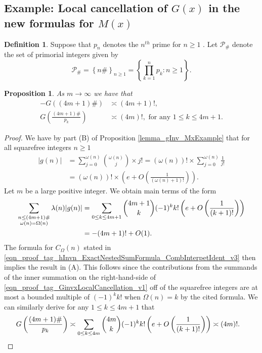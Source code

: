 \documentclass[11pt,reqno,a4letter]{article}
\newcommand{\hlocalref}[1]{\hyperref[#1]{\ref{#1}}}
\numberwithin{equation}{section}
\numberwithin{figure}{section}
\numberwithin{table}{section}
\newcommand{\seqnum}[1]{\href{http://oeis.org/#1}{\color{ProcessBlue}{\underline{#1}}}}
\theoremstyle{plain}
\newtheorem{prop}[theorem]{Proposition}
\numberwithin{theorem}{section}
\theoremstyle{definition}
\newtheorem{definition}[theorem]{Definition}
\begin{document}
\subsection{Example: Local cancellation of 
            $G(x)$ in the new formulas for $M(x)$} 
\label{subSection_LocalCancellationOfGInvx} 

\begin{definition}
Suppose that $p_n$ denotes the $n^{th}$ prime for $n \geq 1$ 
\cite[\seqnum{A000040}]{OEIS}. 
Let $\mathcal{P}_{\#}$ denote the set of primorial integers given by  
\cite[\seqnum{A002110}]{OEIS} 
\[
\mathcal{P}_{\#} = \left\{n\#\right\}_{n \geq 1} = \left\{\prod_{k=1}^{n} p_k : n \geq 1\right\}. 
\]
\end{definition}

\begin{prop}
\label{theorem_PrimorialSeqGInvCalcs_v1} 
As $m \rightarrow \infty$ we have that 
\begin{align} 
\tag{A} 
-G((4m+1)\#) & \asymp (4m+1)!, \\ 
\tag{B} 
G\left(\frac{(4m+1)\#}{p_k}\right) & \asymp (4m)!, 
     \text{ for any } 1 \leq k \leq 4m+1. 
\end{align} 
\end{prop}
\begin{proof} 
We have by part (B) of Proposition \hlocalref{lemma_gInv_MxExample} 
that for all squarefree integers $n \geq 1$ 
\begin{align*} 
|g(n)| & = \sum_{j=0}^{\omega(n)} \binom{\omega(n)}{j} \times j! 
     = (\omega(n))! \times \sum_{j=0}^{\omega(n)} \frac{1}{j!} \\ 
     & = (\omega(n))! \times \left(e + O\left(\frac{1}{(\omega(n)+1)!}\right)\right). 
\end{align*} 
Let $m$ be a large positive integer. 
We obtain main terms of the form 
\begin{align} 
\label{eqn_proof_tag_GinvxLocalCancellation_v1} 
\sum_{\substack{n \leq (4m+1)\# \\ \omega(n)=\Omega(n)}} \lambda(n) |g(n)| 
     & = \sum_{0 \leq k \leq 4m+1} \binom{4m+1}{k} (-1)^{k} k! 
     \left(e + O\left(\frac{1}{(k+1)!}\right)\right) \\ 
\notag 
     & = -(4m+1)! + O(1). 
\end{align} 
The formula for $C_{\Omega}(n)$ stated in 
\eqref{eqn_proof_tag_hInvn_ExactNestedSumFormula_CombInterpetIdent_v3} 
then implies the result in (A). 
This follows since the contributions from the summands of the inner 
summation on the right-hand-side of 
\eqref{eqn_proof_tag_GinvxLocalCancellation_v1} 
off of the squarefree integers 
are at most a bounded multiple of $(-1)^k k!$ when $\Omega(n) = k$ by the 
cited formula. 
We can similarly derive for any $1 \leq k \leq 4m+1$ that 
\begin{align*}
G\left(\frac{(4m+1)\#}{p_k}\right) & \asymp \sum_{0 \leq k \leq 4m} \binom{4m}{k} (-1)^{k} k! 
     \left(e + O\left(\frac{1}{(k+1)!}\right)\right) \asymp (4m)!. 
     \qedhere 
\end{align*}
\end{proof}
\end{document}
